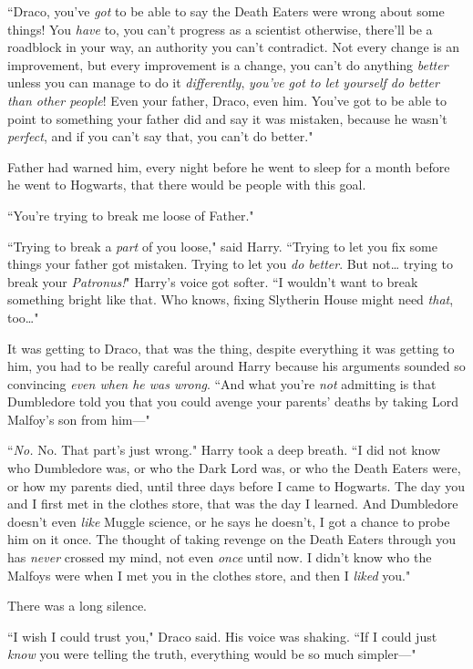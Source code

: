 ``Draco, you've \emph{got} to be able to say the Death Eaters were wrong about some things! You \emph{have} to, you can't progress as a scientist otherwise, there'll be a roadblock in your way, an authority you can't contradict. Not every change is an improvement, but every improvement is a change, you can't do anything \emph{better} unless you can manage to do it \emph{differently}, \emph{you've got to let yourself do better than other people}! Even your father, Draco, even him. You've got to be able to point to something your father did and say it was mistaken, because he wasn't \emph{perfect}, and if you can't say that, you can't do better."

Father had warned him, every night before he went to sleep for a month before he went to Hogwarts, that there would be people with this goal.

``You're trying to break me loose of Father."

``Trying to break a \emph{part} of you loose," said Harry. ``Trying to let you fix some things your father got mistaken. Trying to let you \emph{do better}. But not{\ldots} trying to break your \emph{Patronus!}" Harry's voice got softer. ``I wouldn't want to break something bright like that. Who knows, fixing Slytherin House might need \emph{that}, too{\ldots}"

It was getting to Draco, that was the thing, despite everything it was getting to him, you had to be really careful around Harry because his arguments sounded so convincing \emph{even when he was wrong}. ``And what you're \emph{not} admitting is that Dumbledore told you that you could avenge your parents' deaths by taking Lord Malfoy's son from him—"

``\emph{No.} No. That part's just wrong." Harry took a deep breath. ``I did not know who Dumbledore was, or who the Dark Lord was, or who the Death Eaters were, or how my parents died, until three days before I came to Hogwarts. The day you and I first met in the clothes store, that was the day I learned. And Dumbledore doesn't even \emph{like} Muggle science, or he says he doesn't, I got a chance to probe him on it once. The thought of taking revenge on the Death Eaters through you has \emph{never} crossed my mind, not even \emph{once} until now. I didn't know who the Malfoys were when I met you in the clothes store, and then I \emph{liked} you."

There was a long silence.

``I wish I could trust you," Draco said. His voice was shaking. ``If I could just \emph{know} you were telling the truth, everything would be so much simpler—"

